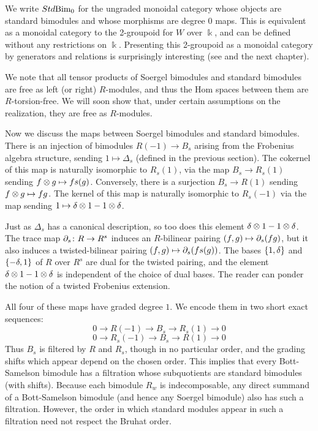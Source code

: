 We write $Std\textrm{Bim}_0$ for the ungraded monoidal category whose objects are standard bimodules and whose morphisms are degree $0$ maps. This is equivalent as a monoidal category to the
2-groupoid for $W$ over $\Bbbk$, and can be defined without any restrictions on $\Bbbk$. Presenting this 2-groupoid as a monoidal category by generators and relations is surprisingly
interesting (see \cite{EWFenn} and the next chapter).

We note that all tensor products of Soergel bimodules and standard bimodules are free as left (or right) $R$-modules, and thus the Hom spaces between them are $R$-torsion-free. We will soon show that, under certain assumptions on the realization, they are free as $R$-modules.

Now we discuss the maps between Soergel bimodules and standard bimodules. There is an injection of bimodules $R(-1) \to B_s$ arising from the Frobenius algebra structure, sending $1
\mapsto \Delta_s$ (defined in the previous section). The cokernel of this map is naturally isomorphic to $R_s(1)$, via the map $B_s \to R_s(1)$ sending $f \otimes g \mapsto fs(g)$. Conversely,
there is a surjection $B_s \to R(1)$ sending $f \otimes g \mapsto fg$. The kernel of this map is naturally isomorphic to $R_s(-1)$ via the map sending $1 \mapsto \delta \otimes 1 - 1 \otimes \delta$.

\begin{remark} Just as $\Delta_s$ has a canonical description, so too does this element $\delta \otimes 1 - 1 \otimes \delta$. The trace map $\partial_s \colon R \rightarrow R^s$ induces an $R$-bilinear pairing $(f,g)
\mapsto \partial_s(fg)$, but it also induces a twisted-bilinear pairing $(f,g) \mapsto \partial_s(f s(g))$. The bases $\{1,\delta\}$ and $\{-\delta,1\}$ of $R$ over $R^s$ are dual for the twisted pairing,
and the element $\delta \otimes 1 - 1 \otimes \delta$ is independent of the choice of dual bases. The reader can ponder the notion of a twisted Frobenius extension. \end{remark}

All four of these maps have graded degree $1$. We encode them in two short exact sequences: \begin{equation} 0 \to R(-1) \to B_s \to R_s(1) \to 0 \label{ses1} \end{equation}
\begin{equation} 0 \to R_s(-1) \to B_s \to R(1) \to 0 \label{ses2} \end{equation} Thus $B_s$ is filtered by $R$ and $R_s$, though in no particular order, and the grading shifts which
appear depend on the chosen order. This implies that every Bott-Samelson bimodule has a filtration whose subquotients are standard bimodules (with shifts). Because each bimodule $R_w$ is
indecomposable, any direct summand of a Bott-Samelson bimodule (and hence any Soergel bimodule) also has such a filtration. However, the order in which standard modules appear in such a
filtration need not respect the Bruhat order.

